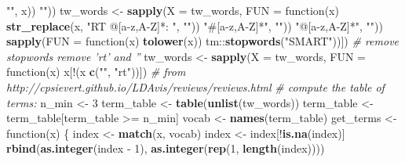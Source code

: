 \documentclass[12pt,]{article}
\newenvironment{Shaded}{\begin{snugshade}}{\end{snugshade}}
\newcommand{\KeywordTok}[1]{\textcolor[rgb]{0.13,0.29,0.53}{\textbf{{#1}}}}
\newcommand{\DataTypeTok}[1]{\textcolor[rgb]{0.13,0.29,0.53}{{#1}}}
\newcommand{\DecValTok}[1]{\textcolor[rgb]{0.00,0.00,0.81}{{#1}}}
\newcommand{\StringTok}[1]{\textcolor[rgb]{0.31,0.60,0.02}{{#1}}}
\newcommand{\CommentTok}[1]{\textcolor[rgb]{0.56,0.35,0.01}{\textit{{#1}}}}
\newcommand{\OtherTok}[1]{\textcolor[rgb]{0.56,0.35,0.01}{{#1}}}
\newcommand{\NormalTok}[1]{{#1}}
\begin{document}
\begin{Shaded}
\begin{Highlighting}[]
{{{{{{{{{{{{{{{{{{{{{{{{    \StringTok{""}\NormalTok{, x)) %
    \StringTok{""}\NormalTok{))}
\NormalTok{tw_words <-}\StringTok{ }\KeywordTok{sapply}\NormalTok{(}\DataTypeTok{X =} \NormalTok{tw_words, }\DataTypeTok{FUN =} \NormalTok{function(x) }\KeywordTok{str_replace}\NormalTok{(x, }
    \StringTok{"RT @[a-z,A-Z]*: "}\NormalTok{, }\StringTok{""}\NormalTok{)) %
    \StringTok{"#[a-z,A-Z]*"}\NormalTok{, }\StringTok{""}\NormalTok{)) %
    \StringTok{"@[a-z,A-Z]*"}\NormalTok{, }\StringTok{""}\NormalTok{)) %
\KeywordTok{sapply}\NormalTok{(}\DataTypeTok{FUN =} \NormalTok{function(x) }\KeywordTok{tolower}\NormalTok{(x)) %
\StringTok{    }\NormalTok{tm::}\KeywordTok{stopwords}\NormalTok{(}\StringTok{"SMART"}\NormalTok{))])}
\CommentTok{# remove stopwords remove 'rt' and ''}
\NormalTok{tw_words <-}\StringTok{ }\KeywordTok{sapply}\NormalTok{(}\DataTypeTok{X =} \NormalTok{tw_words, }\DataTypeTok{FUN =} \NormalTok{function(x) x[!(x %
\StringTok{    }\KeywordTok{c}\NormalTok{(}\StringTok{""}\NormalTok{, }\StringTok{"rt"}\NormalTok{))])}
\CommentTok{# from http://cpsievert.github.io/LDAvis/reviews/reviews.html}
\CommentTok{# compute the table of terms:}
\NormalTok{n_min <-}\StringTok{ }\DecValTok{3}
\NormalTok{term_table <-}\StringTok{ }\KeywordTok{table}\NormalTok{(}\KeywordTok{unlist}\NormalTok{(tw_words)) %
\NormalTok{term_table <-}\StringTok{ }\NormalTok{term_table[term_table >=}\StringTok{ }\NormalTok{n_min]}
\NormalTok{vocab <-}\StringTok{ }\KeywordTok{names}\NormalTok{(term_table)}
\NormalTok{get_terms <-}\StringTok{ }\NormalTok{function(x) \{}
    \NormalTok{index <-}\StringTok{ }\KeywordTok{match}\NormalTok{(x, vocab)}
    \NormalTok{index <-}\StringTok{ }\NormalTok{index[!}\KeywordTok{is.na}\NormalTok{(index)]}
    \KeywordTok{rbind}\NormalTok{(}\KeywordTok{as.integer}\NormalTok{(index -}\StringTok{ }\DecValTok{1}\NormalTok{), }\KeywordTok{as.integer}\NormalTok{(}\KeywordTok{rep}\NormalTok{(}\DecValTok{1}\NormalTok{, }\KeywordTok{length}\NormalTok{(index))))}
}}}}}}}}}}}}}}}}}}}}}}}}}}}}}}}
\end{Highlighting}
\end{Shaded}
\end{document}
